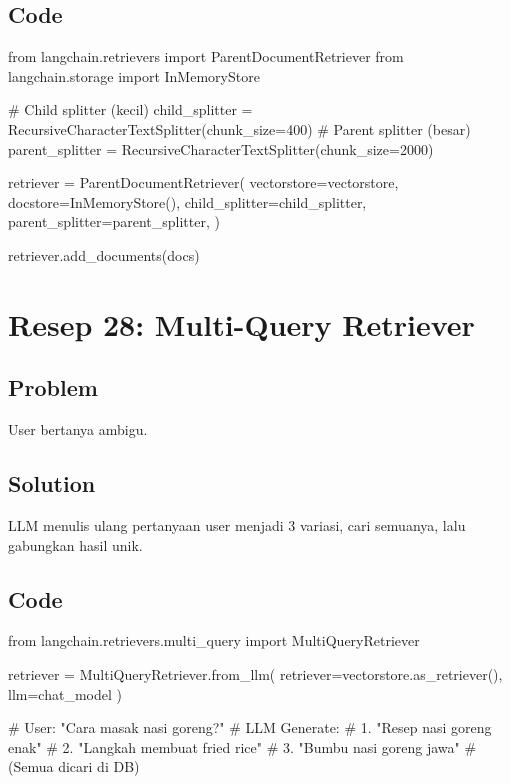 \subsection*{Code}
\begin{codeblock}[language=Python]
from langchain.retrievers import ParentDocumentRetriever
from langchain.storage import InMemoryStore

# Child splitter (kecil)
child_splitter = RecursiveCharacterTextSplitter(chunk_size=400)
# Parent splitter (besar)
parent_splitter = RecursiveCharacterTextSplitter(chunk_size=2000)

retriever = ParentDocumentRetriever(
    vectorstore=vectorstore,
    docstore=InMemoryStore(),
    child_splitter=child_splitter,
    parent_splitter=parent_splitter,
)

retriever.add_documents(docs)
\end{codeblock}

\newpage

\section{Resep 28: Multi-Query Retriever}

\subsection*{Problem}
User bertanya ambigu.

\subsection*{Solution}
LLM menulis ulang pertanyaan user menjadi 3 variasi, cari semuanya, lalu gabungkan hasil unik.

\subsection*{Code}
\begin{codeblock}[language=Python]
from langchain.retrievers.multi_query import MultiQueryRetriever

retriever = MultiQueryRetriever.from_llm(
    retriever=vectorstore.as_retriever(),
    llm=chat_model
)

# User: "Cara masak nasi goreng?"
# LLM Generate:
# 1. "Resep nasi goreng enak"
# 2. "Langkah membuat fried rice"
# 3. "Bumbu nasi goreng jawa"
# (Semua dicari di DB)
\end{codeblock}

